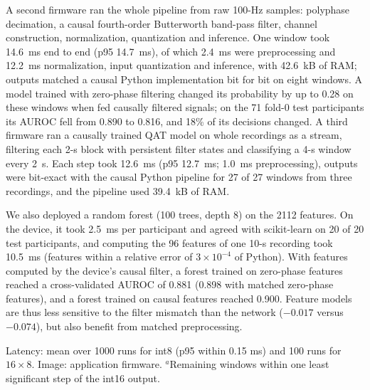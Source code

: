 \documentclass[preprint,12pt]{elsarticle}
\begin{document}
A second firmware ran the whole pipeline from raw 100-Hz samples: polyphase decimation, a causal fourth-order Butterworth band-pass filter, channel construction, normalization, quantization and inference. One window took 14.6~ms end to end (p95 14.7~ms), of which 2.4~ms were preprocessing and 12.2~ms normalization, input quantization and inference, with 42.6~kB of RAM; outputs matched a causal Python implementation bit for bit on eight windows. A model trained with zero-phase filtering changed its probability by up to 0.28 on these windows when fed causally filtered signals; on the 71 fold-0 test participants its AUROC fell from 0.890 to 0.816, and 18\% of its decisions changed. A third firmware ran a causally trained QAT model on whole recordings as a stream, filtering each 2-s block with persistent filter states and classifying a 4-s window every 2~s. Each step took 12.6~ms (p95 12.7~ms; 1.0~ms preprocessing), outputs were bit-exact with the causal Python pipeline for 27 of 27 windows from three recordings, and the pipeline used 39.4~kB of RAM.

We also deployed a random forest (100 trees, depth 8) on the 2112 features. On the device, it took 2.5~ms per participant and agreed with scikit-learn on 20 of 20 test participants, and computing the 96 features of one 10-s recording took 10.5~ms (features within a relative error of $3\times10^{-4}$ of Python). With features computed by the device's causal filter, a forest trained on zero-phase features reached a cross-validated AUROC of 0.881 (0.898 with matched zero-phase features), and a forest trained on causal features reached 0.900. Feature models are thus less sensitive to the filter mismatch than the network ($-0.017$ versus $-0.074$), but also benefit from matched preprocessing.

\begin{table}[!t]
\caption{Network inference on the ESP32-S3 (240 MHz, fold-0 models).}
\label{tab:board}
\centering\small
{}

\vspace{2pt}\parbox{\linewidth}{\footnotesize Latency: mean over 1000 runs for int8 (p95 within 0.15 ms) and 100 runs for $16\times8$. Image: application firmware. $^{a}$Remaining windows within one least significant step of the int16 output.}
\end{table}
\end{document}

